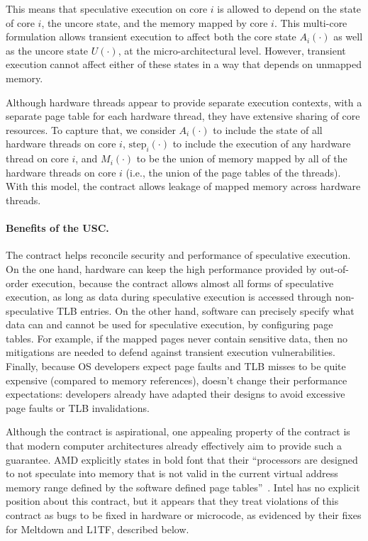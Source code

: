 This means that speculative execution on core $i$ is allowed to depend on
the state of core $i$, the uncore state, and the memory mapped by core
$i$.  This multi-core formulation allows transient execution to affect
both the core state $A_i(\cdot)$ as well as the uncore state $U(\cdot)$,
at the micro-architectural level.  However, transient execution cannot
affect either of these states in a way that depends on unmapped memory.

Although hardware threads appear to provide separate execution
contexts, with a separate page table for each hardware thread, they
have extensive sharing of core resources.  To capture that, we consider
$A_i(\cdot)$ to include the state of all hardware threads on core $i$,
$\textrm{step}_i(\cdot)$ to include the execution of any hardware thread
on core $i$, and $M_i(\cdot)$ to be the union of memory mapped by all
of the hardware threads on core $i$ (i.e., the union of the page tables
of the threads).  With this model, the contract allows leakage of mapped
memory across hardware threads.


\paragraph{Benefits of the USC.}

The contract helps reconcile security and performance of speculative
execution.  On the one hand, hardware can keep the high performance
provided by out-of-order execution, because the contract allows almost
all forms of speculative execution, as long as data during speculative
execution is accessed through non-speculative TLB entries.  On the
other hand, software can precisely specify what data can and cannot
be used for speculative execution, by configuring page
tables.  For example, if the mapped pages never contain sensitive data,
then no mitigations are needed to defend against transient execution
vulnerabilities.  Finally,
because OS developers expect page faults and TLB misses to be quite
expensive (compared to memory references), \contract doesn't change
their performance expectations: developers already have adapted their
designs to avoid excessive page faults or TLB invalidations.

Although the contract is aspirational, one appealing property of the
contract is that modern computer architectures already effectively aim
to provide such a guarantee.  AMD explicitly states in bold font that
their ``processors are designed to not speculate into memory that is
not valid in the current virtual address memory range defined by the
software defined page tables''~\cite[pg. 2]{amd:speculation}.  Intel
has no explicit position about this contract, but it appears
that they treat violations of this contract as bugs to be fixed in
hardware or microcode, as evidenced by their fixes for Meltdown and
L1TF, described below.

